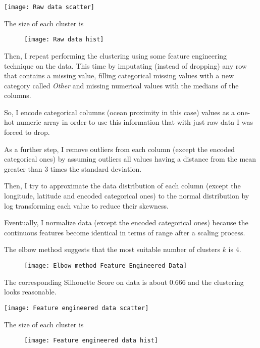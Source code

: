 \documentclass[11pt]{article}
\begin{document}
{
\centering
\texttt{[image: Raw data scatter]}
}

The size of each cluster is

\begin{figure}[h]
  \centering
  \texttt{[image: Raw data hist]}
\end{figure}

\bigskip
Then, I repeat performing the clustering using some feature engineering technique on the data.
This time by imputating (instead of dropping) any row that contains a missing value, filling categorical missing values with
a new category called \textit{Other} and missing numerical values with the medians of the columns.

\bigskip
So, I encode categorical columns (ocean proximity in this case) values as a one-hot numeric array in order to use this information
that with just raw data I was forced to drop.

\bigskip
As a further step, I remove outliers from each column (except the encoded categorical ones) by assuming outliers all values
having a distance from the mean greater than 3 times the standard deviation.

\bigskip
Then, I try to approximate the data distribution of each column (except the longitude, latitude and encoded categorical ones)
to the normal distribution by log transforming each value to reduce their skewness.

\bigskip
Eventually, I normalize data (except the encoded categorical ones) because the continuous features become identical in terms of range after a scaling process.

\bigskip
The elbow method suggests that the most suitable number of clusters $k$ is 4.

\begin{figure}[h]
  \centering
  \texttt{[image: Elbow method Feature Engineered Data]}
\end{figure}

\newpage
The corresponding Silhouette Score on data is about 0.666 and the clustering looks reasonable.

{
\centering
\texttt{[image: Feature engineered data scatter]}
}

The size of each cluster is

\begin{figure}[h]
  \centering
  \texttt{[image: Feature engineered data hist]}
\end{figure}
\end{document}
